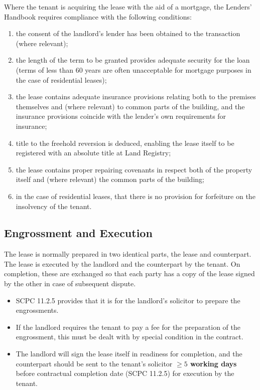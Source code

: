 \documentclass[
]{article}
\providecommand{\tightlist}{%
  \setlength{\itemsep}{0pt}\setlength{\parskip}{0pt}}
\begin{document}
Where the tenant is acquiring the lease with the aid of a mortgage, the
Lenders' Handbook requires compliance with the following conditions:

\begin{enumerate}
\tightlist
\item
  the consent of the landlord's lender has been obtained to the
  transaction (where relevant);
\item
  the length of the term to be granted provides adequate security for
  the loan (terms of less than 60 years are often unacceptable for
  mortgage purposes in the case of residential leases);
\item
  the lease contains adequate insurance provisions relating both to the
  premises themselves and (where relevant) to common parts of the
  building, and the insurance provisions coincide with the lender's own
  requirements for insurance;
\item
  title to the freehold reversion is deduced, enabling the lease itself
  to be registered with an absolute title at Land Registry;
\item
  the lease contains proper repairing covenants in respect both of the
  property itself and (where relevant) the common parts of the building;
\item
  in the case of residential leases, that there is no provision for
  forfeiture on the insolvency of the tenant.
\end{enumerate}

\hypertarget{engrossment-and-execution}{%
\subsection{Engrossment and Execution}\label{engrossment-and-execution}}

The lease is normally prepared in two identical parts, the lease and
counterpart. The lease is executed by the landlord and the counterpart
by the tenant. On completion, these are exchanged so that each party has
a copy of the lease signed by the other in case of subsequent dispute.

\begin{itemize}
\tightlist
\item
  SCPC 11.2.5 provides that it is for the landlord's solicitor to
  prepare the engrossments.
\item
  If the landlord requires the tenant to pay a fee for the preparation
  of the engrossment, this must be dealt with by special condition in
  the contract.
\item
  The landlord will sign the lease itself in readiness for completion,
  and the counterpart should be sent to the tenant's solicitor
  \textbf{{\(\geq 5\)} working days} before contractual completion date
  (SCPC 11.2.5) for execution by the tenant.
\end{itemize}
\end{document}
